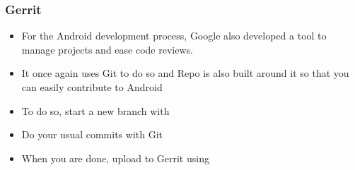 \begin{frame}
  \frametitle{Gerrit}
  \begin{itemize}
  \item For the Android development process, Google also developed a
    tool to manage projects and ease code reviews.
  \item It once again uses Git to do so and Repo is also built around
    it so that you can easily contribute to Android
  \item To do so, start a new branch with 
  \item Do your usual commits with Git
  \item When you are done, upload to Gerrit using 
  \end{itemize}
\end{frame}
